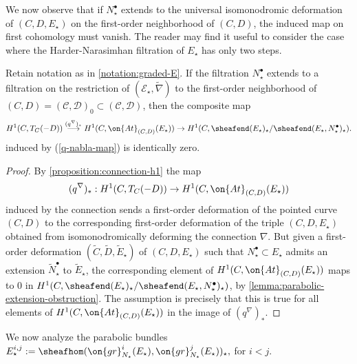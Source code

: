 We now observe that if $N_\star^\bullet$ extends to the universal isomonodromic deformation of
$(C,D, E_\star)$ on the first-order neighborhood of $(C,D)$, the induced map on first cohomology must vanish. The reader may find it useful to consider the case where the Harder-Narasimhan filtration of $E_\star$ has only two steps.

\begin{lemma}
\notready
	\label{lemma:h1-map}
	Retain notation as in \autoref{notation:graded-E}.
If the filtration $N_\star^\bullet$ extends to a filtration on the restriction of
$(\mathscr E_\star,\widetilde{\nabla})$ to the first-order neighborhood of $(C,D)=(\mathscr{C}, \mathscr{D})_0\subset (\mathscr{C}, \mathscr{D})$,
then the composite map
\begin{align*}
	H^1(C,T_C(-D))
\overset{(q^\nabla)_*}\longrightarrow H^1(C, \on{At}_{(C,D)}(E_\star))
\to H^1(C, \sheafend(E_\star)_\star/\sheafend(E_\star, N^\bullet_\star)_\star).
\end{align*}
induced by (\ref{q-nabla-map}) is identically zero.
\end{lemma}
\begin{proof}
By \autoref{proposition:connection-h1}
the map $$(q^\nabla)_*: H^1(C,T_C(-D))\to
H^1(C, \on{At}_{(C,D)}(E_\star))$$
induced by the connection
sends a first-order deformation of the pointed curve $(C,D)$
to the corresponding first-order deformation of the triple $(C,D,E_\star)$
obtained from isomonodromically deforming the connection $\nabla$.
But given a first-order deformation $(\widetilde{C}, \widetilde{D} ,
\widetilde{E}_\star)$
of $(C, D, E_\star)$
such that $N_\star^\bullet \subset E_\star$ admits an extension $\widetilde N_\star^\bullet$ to
$\widetilde E_\star$,
the corresponding element of
$H^1(C, \on{At}_{(C,D)}(E_\star))$ maps to $0$ in $H^1(C,
\sheafend(E_\star)_\star/\sheafend(E_\star, N^\bullet_\star)_\star)$,
by \autoref{lemma:parabolic-extension-obstruction}. The assumption is precisely that this is true for all elements of $H^1(C, \on{At}_{(C,D)}(E_\star))$ in the image of $(q^\nabla)_*$.
\end{proof}

We now analyze the parabolic bundles $E_\star^{i,j}:=\sheafhom(\on{gr}^i_{N_\star}(E_\star),
\on{gr}^j_{N_\star}(E_\star))_\star,$ for $i<j.$

